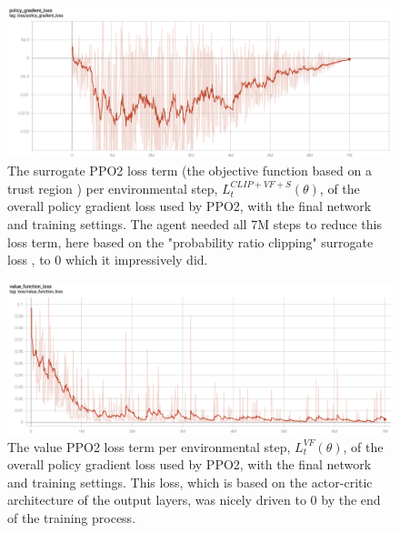 \begin{figure}
    \centering
    \includegraphics[width=\textwidth]{Figures/ppo2_surrogate_loss.png}
    \caption{The surrogate PPO2 loss term (the objective function based on a trust region \cite{PPO2}) per environmental step, $L_{t}^{C L I P+V F+S}(\theta)$, of the overall policy gradient loss used by PPO2, with the final network and training settings. The agent needed all 7M steps to reduce this loss term, here based on the "probability ratio clipping" surrogate loss \cite{PPO2}, to 0 which it impressively did.}
    \label{fig: ppo2_surrogate_loss}
\end{figure}

\begin{figure}
    \centering
    \includegraphics[width=\textwidth]{Figures/ppo2_value_function_loss.png}
    \caption{The value PPO2 loss term per environmental step, $L_{t}^{V F}(\theta)$, of the overall policy gradient loss used by PPO2, with the final network and training settings. This loss, which is based on the actor-critic architecture of the output layers, was nicely driven to 0 by the end of the training process.}
    \label{fig: ppo2_value_function_loss}
\end{figure}

